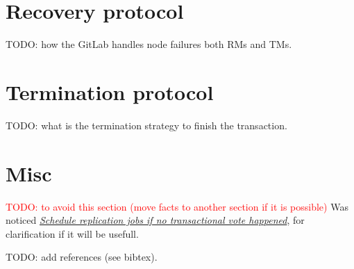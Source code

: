 \documentclass[acmlarge, screen, nonacm]{acmart}
\newcommand{\todo}[1]{\textcolor{red}{TODO: #1}}
\begin{document}
\section{Recovery protocol}

TODO: how the GitLab handles node failures both RMs and TMs.

\section{Termination protocol}

TODO: what is the termination strategy to finish the transaction.

\section{Misc}
\todo{to avoid this section (move facts to another section if it is possible)}
  Was noticed
  \emph{\href{https://gitlab.com/gitlab-org/gitaly/-/issues/2466}{Schedule replication jobs if no transactional vote happened}},
  for clarification if it will be usefull.

TODO: add references (see bibtex).
\end{document}
